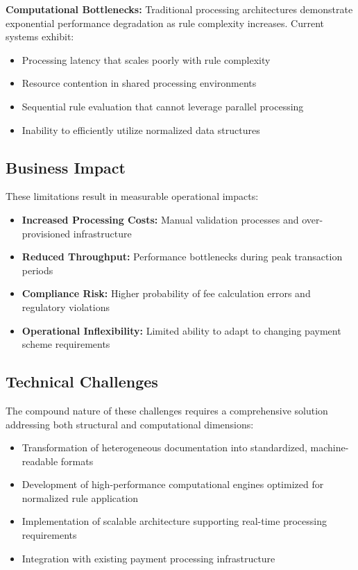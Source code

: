 \textbf{Computational Bottlenecks:} Traditional processing architectures demonstrate exponential performance degradation as rule complexity increases. Current systems exhibit:
\begin{itemize}
   \item Processing latency that scales poorly with rule complexity
   \item Resource contention in shared processing environments
   \item Sequential rule evaluation that cannot leverage parallel processing
   \item Inability to efficiently utilize normalized data structures
\end{itemize}

\subsection{Business Impact}

These limitations result in measurable operational impacts:

\begin{itemize}
   \item \textbf{Increased Processing Costs:} Manual validation processes and over-provisioned infrastructure
   \item \textbf{Reduced Throughput:} Performance bottlenecks during peak transaction periods
   \item \textbf{Compliance Risk:} Higher probability of fee calculation errors and regulatory violations
   \item \textbf{Operational Inflexibility:} Limited ability to adapt to changing payment scheme requirements
\end{itemize}

\subsection{Technical Challenges}

The compound nature of these challenges requires a comprehensive solution addressing both structural and computational dimensions:

\begin{itemize}
   \item Transformation of heterogeneous documentation into standardized, machine-readable formats
   \item Development of high-performance computational engines optimized for normalized rule application
   \item Implementation of scalable architecture supporting real-time processing requirements
   \item Integration with existing payment processing infrastructure
\end{itemize}

